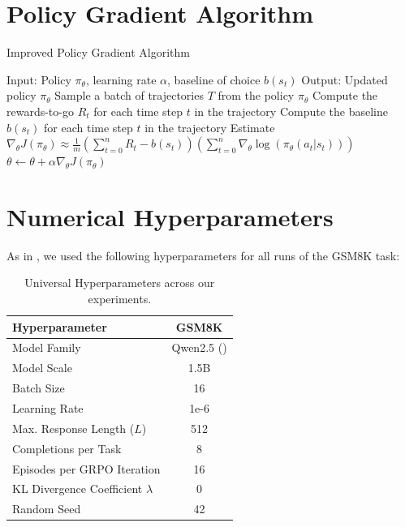 \documentclass{article} %
\theoremstyle{definition}
\begin{document}
\section{Policy Gradient Algorithm}
\label{sec:alg-reinforce}

\begin{algorithm}[H] 
    \caption{Improved Policy Gradient Algorithm}
    \label{alg:reinforce}
    \begin{algorithmic}[1]
        \State Input: Policy $\pi_\theta$, learning rate $\alpha$, baseline of choice $b(s_t)$
        \State Output: Updated policy $\pi_\theta$
            \State Sample a batch of trajectories $T$ from the policy $\pi_\theta$
                \State Compute the rewards-to-go $R_t$ for each time step $t$ in the trajectory
                \State Compute the baseline $b(s_t)$ for each time step $t$ in the trajectory
                \State Estimate $\nabla_\theta J(\pi_\theta) \approx \frac{1}{m} \left(\sum_{t = 0}^{n} R_t - b(s_t)\right) \left( \sum_{t=0}^{n} \nabla_\theta \log(\pi_\theta(a_t | s_t)) \right)$
            \EndFor
            \State $\theta \leftarrow \theta + \alpha \nabla_\theta J(\pi_\theta)$
        \EndWhile
    \end{algorithmic}
\end{algorithm}

\section{Numerical Hyperparameters}

As in \cite{wk10}, we used the following hyperparameters for all runs of the GSM8K task:
\begin{table}[h]
    \centering
    \begin{tabular}{|l|c|}
        \hline
        \textbf{Hyperparameter} & \textbf{GSM8K} \\
        \hline
        Model Family & Qwen2.5 (\cite{Qwen-et-al-2025}) \\
        \hline
        Model Scale & 1.5B \\
        \hline
        Batch Size & 16 \\
        \hline
        Learning Rate & 1e-6 \\
        \hline
        Max. Response Length ($L$) & 512 \\
        \hline
        Completions per Task & 8 \\
        \hline
        Episodes per GRPO Iteration & 16\\
        \hline
        KL Divergence Coefficient $\lambda$ & 0 \\
        \hline
        Random Seed & 42 \\
        \hline
    \end{tabular}
    \caption{Universal Hyperparameters across our experiments.}
    \label{tab:universal-hyperparams}
\end{table}
\end{document}
